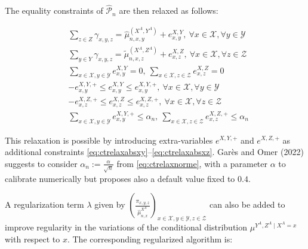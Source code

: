 The equality constraints of \(\widehat{\mathcal{P}}_n\) are then relaxed as follows:

\begin{align}
            & \sum_{z\in Z} \gamma_{x,y,z} = \hat{\mu}^{(X^A,Y^A)}_{n,x,y} + e^{X,Y}_{x,y}, \:\forall x\in\mathcal{X}, \forall y\in \mathcal{Y}    \label{eq:relaxationxy}\\
            & \sum_{y\in Y} \gamma_{x,y,z} = \tilde{\mu}^{(X^A,Z^A)}_{n,x,z} + e^{X,Z}_{x,z}, \:\forall x\in\mathcal{X}, \forall z\in \mathcal{Z}    \label{eq:relaxationxz}\\
            & \sum_{x\in \mathcal{X},y\in \mathcal{Y}} e^{X,Y}_{x,y} = 0,\: \sum_{x\in \mathcal{X},z\in \mathcal{Z}} e^{X,Z}_{x,z} = 0     \label{eq:relaxsum}\\
            & -e^{X,Y,+}_{x,y}\leq e^{X,Y}_{x,y} \leq e^{X,Y,+}_{x,y}, \:\forall x\in\mathcal{X}, \forall y\in \mathcal{Y}    \label{eq:ctrelaxabsxy}\\
            & -e^{X,Z,+}_{x,z}\leq e^{X,Z}_{x,z} \leq e^{X,Z,+}_{x,z}, \:\forall x\in\mathcal{X}, \forall z\in \mathcal{Z}    \label{eq:ctrelaxabsxz}\\
            & \sum_{x\in \mathcal{X},y\in \mathcal{Y}} e^{X,Y,+}_{x,y} \leq \alpha_n,\: \sum_{x\in \mathcal{X},z\in \mathcal{Z}} e^{X,Z,+}_{x,z} \leq \alpha_n  \label{eq:ctrelaxnorme}
\end{align}

This relaxation is possible by introducing extra-variables \(e^{X,Y,+}\) and \(e^{X,Z,+}\) as additional constraints \eqref{eq:ctrelaxabsxy}--\eqref{eq:ctrelaxabsxz}.
Garès and Omer (2022) suggests to consider \(\alpha_n:=\frac{\alpha}{\sqrt{n}}\) from \eqref{eq:ctrelaxnorme}, with a parameter \(\alpha\) to calibrate numerically but proposes also a default value fixed to \(0.4\).

A regularization term \(\lambda\) given by \((\frac{\pi_{x,y,z}}{\hat{\mu}^{X^A}_{n,x}})_{x\in\mathcal{X},y\in\mathcal{Y},z\in\mathcal{Z}}\) can also be added to improve regularity in the variations of the conditional distribution \(\mu^{Y^A,Z^A\mid X^A=x}\) with respect to \(x\). The corresponding regularized algorithm is:


